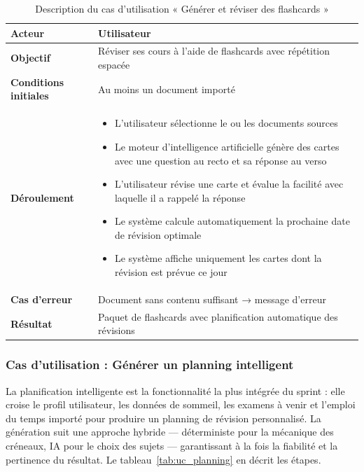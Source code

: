 \begin{table}[H]
\centering
\renewcommand{\arraystretch}{1.2}
\begin{tabular}{|p{4cm}|p{10cm}|}
\hline
\textbf{Acteur} & Utilisateur \\ \hline
\textbf{Objectif} & Réviser ses cours à l'aide de flashcards avec répétition
                    espacée \\ \hline
\textbf{Conditions initiales} & Au moins un document importé \\ \hline
\textbf{Déroulement} &
\begin{itemize}
    \item L'utilisateur sélectionne le ou les documents sources
    \item Le moteur d'intelligence artificielle génère des cartes avec une question au recto et sa réponse au verso
    \item L'utilisateur révise une carte et évalue la facilité avec laquelle il a rappelé la réponse
    \item Le système calcule automatiquement la prochaine date de révision optimale
    \item Le système affiche uniquement les cartes dont la révision est prévue ce jour
\end{itemize} \\ \hline
\textbf{Cas d'erreur} & Document sans contenu suffisant →
                        message d'erreur \\ \hline
\textbf{Résultat} & Paquet de flashcards avec planification automatique
                    des révisions \\ \hline
\end{tabular}
\caption{Description du cas d'utilisation « Générer et réviser des flashcards »}
\label{tab:uc_flashcard}
\end{table}

\subsubsection{Cas d'utilisation : Générer un planning intelligent}

La planification intelligente est la fonctionnalité la plus intégrée du sprint :
elle croise le profil utilisateur, les données de sommeil, les examens à venir et
l'emploi du temps importé pour produire un planning de révision personnalisé.
La génération suit une approche hybride — déterministe pour la mécanique des
créneaux, IA pour le choix des sujets — garantissant à la fois la fiabilité
et la pertinence du résultat. Le tableau~\ref{tab:uc_planning} en décrit les étapes.

